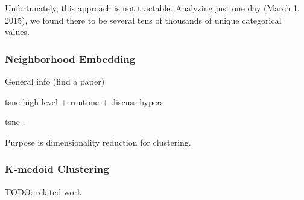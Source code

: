 Unfortunately, this approach is not tractable. Analyzing just one day (March 1, 2015), we found there to be several tens of thousands of unique categorical values. 

\subsubsection{Neighborhood Embedding}

General info (find a paper)

tsne high level + runtime + discuss hypers

tsne \cite{van2008visualizing}.

Purpose is dimensionality reduction for clustering.

\subsubsection{K-medoid Clustering}

TODO: related work

